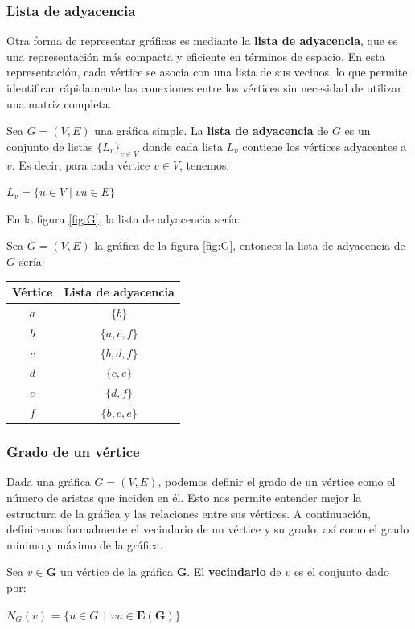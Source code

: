 \subsubsection{Lista de adyacencia}
Otra forma de representar gráficas es mediante la \textbf{lista de adyacencia}, que es una representación más compacta y eficiente en términos de espacio. En esta representación, cada vértice se asocia con una lista de sus vecinos, lo que permite identificar rápidamente las conexiones entre los vértices sin necesidad de utilizar una matriz completa.
\begin{definition}
    Sea $G = (V,E)$ una gráfica simple. La \textbf{lista de adyacencia} de $G$ es un conjunto de listas $\{L_v\}_{v \in V}$ donde cada lista $L_v$ contiene los vértices adyacentes a $v$. Es decir, para cada vértice $v \in V$, tenemos:
    \begin{center}
        $L_v = \{u \in V \mid vu \in E\}$
    \end{center}
\end{definition}
\noindent En la figura \ref{fig:G}, la lista de adyacencia sería:
\begin{example}
    Sea $G = (V,E)$ la gráfica de la figura \ref{fig:G}, entonces la lista de adyacencia de $G$ sería:
    \begin{center}
        \begin{tabular}{c|c}
            Vértice & Lista de adyacencia \\
            \hline
            $a$ & $\{b\}$ \\
            $b$ & $\{a, c, f\}$ \\
            $c$ & $\{b, d, f\}$ \\
            $d$ & $\{c, e\}$ \\
            $e$ & $\{d, f\}$ \\
            $f$ & $\{b, c, e\}$
        \end{tabular}
    \end{center}
\end{example}



\subsubsection{Grado de un vértice}
\noindent Dada una gráfica $G = (V,E)$, podemos definir el grado de un vértice como el número de aristas que inciden en él. Esto nos permite entender mejor la estructura de la gráfica y las relaciones entre sus vértices. A continuación, definiremos formalmente el vecindario de un vértice y su grado, así como el grado mínimo y máximo de la gráfica.
\begin{definition}[Vecindario]
    Sea $v \in \mathbf{G}$ un vértice de la gráfica $\mathbf{G}$. El \textbf{vecindario} de $v$ es el conjunto dado por:
    \begin{center}
        $N_G(v)$ = $\{u \in G \hspace{5pt} | \hspace{5pt} vu \in \mathbf{E(G)}\}$
    \end{center}
\end{definition}

